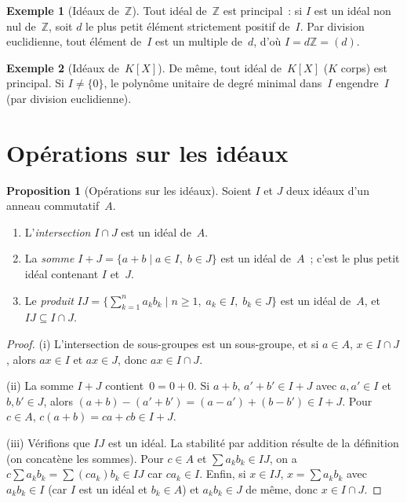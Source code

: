 \documentclass[12pt,a4paper,openany]{book}
\theoremstyle{definition}
\newtheorem{proposition}{Proposition}[chapter]
\newtheorem{exemple}{Exemple}[chapter]
\newcommand{\Z}{\mathbb{Z}}
\begin{document}
\begin{exemple}[Idéaux de~$\Z$]\label{ex:ideaux-Z}
\index{idéal!de $\Z$}
Tout idéal de~$\Z$ est principal~: si $I$ est un idéal non nul de~$\Z$,
soit $d$ le plus petit élément strictement positif de~$I$. Par division
euclidienne, tout élément de~$I$ est un multiple de~$d$, d'où $I = d\Z = (d)$.
\end{exemple}

\begin{exemple}[Idéaux de~{$K[X]$}]\label{ex:ideaux-KX}
De même, tout idéal de~$K[X]$ ($K$ corps) est principal. Si $I \neq \{0\}$,
le polynôme unitaire de degré minimal dans~$I$ engendre~$I$ (par division
euclidienne).
\end{exemple}

\section{Opérations sur les idéaux}\label{sec:operations-ideaux}

\begin{proposition}[Opérations sur les idéaux]\label{prop:operations-ideaux}
Soient $I$ et $J$ deux idéaux d'un anneau commutatif~$A$.
\begin{enumerate}[label=\textup{(\roman*)}]
  \item L'\emph{intersection} $I \cap J$ est
        un idéal de~$A$.
  \item La \emph{somme}
        $I + J = \{a + b \mid a \in I,\; b \in J\}$ est un idéal de~$A$~;
        c'est le plus petit idéal contenant $I$ et~$J$.
  \item Le \emph{produit}
        $IJ = \bigl\{\sum_{k=1}^{n} a_k b_k \mid n \geqslant 1,\;
        a_k \in I,\; b_k \in J\bigr\}$ est un idéal de~$A$, et
        $IJ \subseteq I \cap J$.
\end{enumerate}
\end{proposition}

\begin{proof}
(i) L'intersection de sous-groupes est un sous-groupe, et si $a \in A$,
$x \in I \cap J$, alors $ax \in I$ et $ax \in J$, donc $ax \in I \cap J$.

(ii) La somme $I + J$ contient~$0 = 0 + 0$. Si $a + b,\, a' + b' \in I + J$
avec $a, a' \in I$ et $b, b' \in J$, alors $(a + b) - (a' + b') =
(a - a') + (b - b') \in I + J$. Pour $c \in A$,
$c(a + b) = ca + cb \in I + J$.

(iii) Vérifions que $IJ$ est un idéal. La stabilité par addition
résulte de la définition (on concatène les sommes). Pour $c \in A$ et
$\sum a_k b_k \in IJ$, on a $c \sum a_k b_k = \sum (ca_k) b_k \in IJ$
car $ca_k \in I$. Enfin, si $x \in IJ$, $x = \sum a_k b_k$ avec
$a_k b_k \in I$ (car $I$ est un idéal et $b_k \in A$) et
$a_k b_k \in J$ de même, donc $x \in I \cap J$.
\end{proof}
\end{document}
